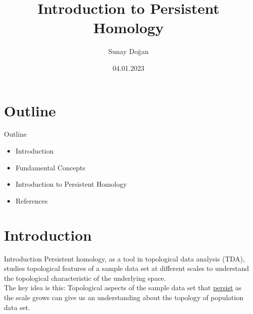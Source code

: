 \documentclass{beamer}
\title[Intr. to Persistent Homology]{Introduction to Persistent Homology}
\author{Sunay Doğan}
\institute{METU}
\date{04.01.2023}
\begin{document}
\begin{frame}
    \titlepage
\end{frame}
\section{Outline}
\begin{frame}{Outline}

    \begin{itemize}
        \item Introduction
        \item Fundamental Concepts
        \item Introduction to Persistent Homology
        \item References
    \end{itemize}
    
\end{frame}

\section{Introduction}
\begin{frame}{Introduction}
    Persistent homology, as a tool in topological data analysis (TDA), studies topological features of a sample data set at different scales to understand the topological characteristic of the underlying space.\\
    \vspace*{0.5cm}
    The key idea is this: Topological aspects of the sample data set that \underline{persist} as the scale grows can give us an understanding about the topology of population data set. 
\end{frame}
\end{document}
